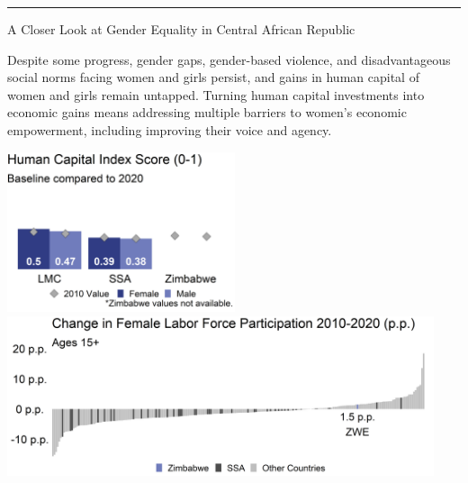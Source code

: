 \documentclass[
]{article}
\begin{document}
\vspace{.3cm}

\centering\rule{19.5cm}{0.5pt}

\vspace{.3cm}

\begin{minipage}[c][1.65cm][t]{19.5cm}
\begin{minipage}[c][1.65cm][t]{6cm}
\begin{spacing}{2}\fontsize{14}{1}\selectfont   
A Closer Look at Gender Equality in Central African Republic
\normalsize
\end{spacing}\end{minipage}\hspace{0.5cm}
\begin{minipage}[c][1.65cm][t]{12.75cm}
\fontsize{9}{8}\selectfont   
Despite some progress, gender gaps, gender-based violence, and disadvantageous social norms facing women and girls persist, and gains in human capital of women and girls remain untapped. Turning human capital investments into economic gains means addressing multiple barriers to women’s economic empowerment, including improving their voice and agency.
\normalsize
\end{minipage}
\end{minipage}

\vspace{.15cm}

\begin{minipage}[t][4.7cm][t]{19.5cm}
\href{https://genderdata.worldbank.org/indicators/hd-hci-ovrl}{\includegraphics[height=4.7cm]{HCIplot.png}}\hspace{.2cm}
\href{https://genderdata.worldbank.org/indicators/sl-tlf-acti-zs/}{\includegraphics[height=4.7cm]{LFPplot.png}}  
\end{minipage}
\end{document}
